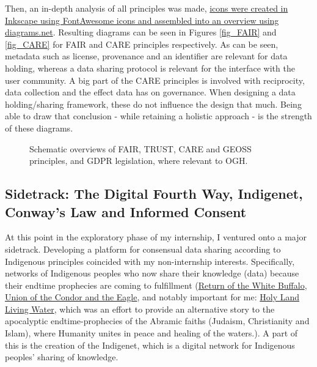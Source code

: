 \documentclass[journal, dvipsnames]{IEEEtran}
\begin{document}
Then, an in-depth analysis of all principles was made, \href{https://gitlab.opengeohub.org/fee.gevaert/principle-layouts#howto-diagrams}{icons were created in Inkscape using FontAwesome icons and assembled into an overview using diagrams.net}. Resulting diagrams can be seen in Figures \ref{fig_FAIR} and \ref{fig_CARE} for FAIR and CARE principles respectively. As can be seen, metadata such as license, provenance and an identifier are relevant for data holding, whereas a data sharing protocol is relevant for the interface with the user community. A big part of the CARE principles is involved with reciprocity, data collection and the effect data has on governance. When designing a data holding/sharing framework, these do not influence the design that much. Being able to draw that conclusion - while retaining a holistic approach -  is the strength of these diagrams.

\begin{figure*}[!t]
\centering
{}
\hfill
{}
\hfill
{}
\caption{Schematic overviews of FAIR, TRUST, CARE and GEOSS principles, and GDPR legislation, where relevant to OGH.}
\label{fig_sim}
\end{figure*}

\subsection{Sidetrack: The Digital Fourth Way, Indigenet, Conway's Law and Informed Consent}\label{sec_sidetrack}

At this point in the exploratory phase of my internship, I ventured onto a major sidetrack. Developing a platform for consensual data sharing according to Indigenous principles coincided with my non-internship interests. Specifically, networks of Indigenous peoples who now share their knowledge (data) because their endtime prophecies are coming to fulfillment (\href{https://whitebuffalomiracle.homestead.com/}{Return of the White Buffalo}, \href{https://app.gaia.gives/project/fulfilling-prophecy-birthing-the-union-of-the-condor-hummingbird-amazon-quetzal-central-america-and-the-eagle}{Union of the Condor and the Eagle}, and notably important for me: \href{https://unity.earth/hllw-in-review/}{Holy Land Living Water}, which was an effort to provide an alternative story to the apocalyptic endtime-prophecies of the Abramic faiths (Judaism, Christianity and Islam), where Humanity unites in peace and healing of the waters.). A part of this is the creation of the Indigenet, which is a digital network for Indigenous peoples' sharing of knowledge.
\end{document}
